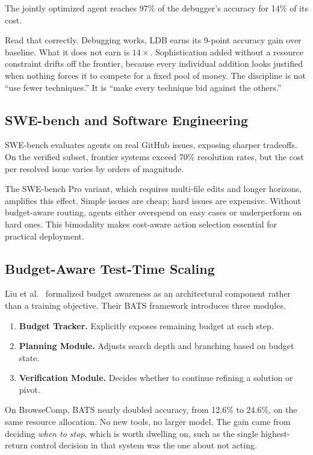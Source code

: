 The jointly optimized agent reaches 97\% of the debugger's accuracy for 14\% of its cost.

Read that correctly. Debugging works, LDB earns its 9-point accuracy gain over baseline. What it does not earn is $14\times$. Sophistication added without a resource constraint drifts off the frontier, because every individual addition looks justified when nothing forces it to compete for a fixed pool of money. The discipline is not ``use fewer techniques.'' It is ``make every technique bid against the others.''

\subsection{SWE-bench and Software Engineering}

SWE-bench \cite{jimenez2024swebench} evaluates agents on real GitHub issues, exposing sharper tradeoffs. On the verified subset, frontier systems exceed 70\% resolution rates, but the cost per resolved issue varies by orders of magnitude.

The SWE-bench Pro variant, which requires multi-file edits and longer horizons, amplifies this effect. Simple issues are cheap; hard issues are expensive. Without budget-aware routing, agents either overspend on easy cases or underperform on hard ones. This bimodality makes cost-aware action selection essential for practical deployment.

\subsection{Budget-Aware Test-Time Scaling}

Liu et al.\ \cite{liu2025bats} formalized budget awareness as an architectural component rather than a training objective. Their BATS framework introduces three modules.

\begin{enumerate}
\item \textbf{Budget Tracker.} Explicitly exposes remaining budget at each step.
\item \textbf{Planning Module.} Adjusts search depth and branching based on budget state.
\item \textbf{Verification Module.} Decides whether to continue refining a solution or pivot.
\end{enumerate}

On BrowseComp, BATS nearly doubled accuracy, from 12.6\% to 24.6\%, on the same resource allocation. No new tools, no larger model. The gain came from deciding \emph{when to stop}, which is worth dwelling on, such as the single highest-return control decision in that system was the one about not acting.

